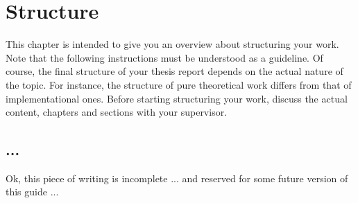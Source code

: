 \chapter{Structure}

This chapter is intended to give you an overview about structuring your work. Note that the following instructions must be understood as a guideline. Of course, the final structure of your thesis report depends on the actual nature of the topic. For instance, the structure of pure theoretical work differs from that of implementational ones. Before starting structuring your work, discuss the actual content, chapters and sections with your supervisor.

\section{...}

Ok, this piece of writing is incomplete ... and reserved for some future version of this guide ...